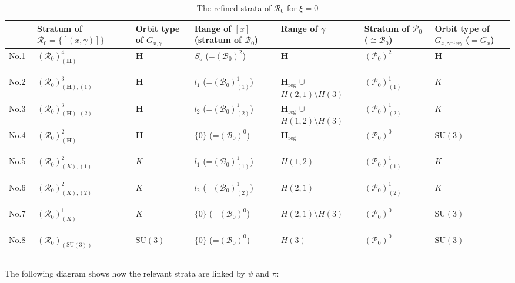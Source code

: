 \documentclass[12pt]{amsart}
\theoremstyle{definition}
\numberwithin{equation}{section}
\newcommand{\SU}{\mathrm{SU}}
\newcommand{\SET}[1]{\{#1\}}
\newcommand{\Hreg}{\Cartan_{\mathrm{reg}}}
\newcommand{\Cartan}{\mathbf{H}}
\newcommand{\Rxizero}{\mathcal{R}_{0}}
\newcommand{\Pxizero}{\mathcal{P}_{0}}
\newcommand{\Bxizero}{\mathcal{B}_{0}}
\begin{document}
       \begin{table}[H]\centering
 \caption{The refined strata of  $\Rxizero $    for  $\xi=0$ } \label{Table:strataxizero}
 \begin{tabularx}{\textwidth}{|>{\raggedright\arraybackslash}X|p{2cm}  |>{\raggedright\arraybackslash}X|p{3cm}|>{\raggedright\arraybackslash}X|>{\raggedright\arraybackslash}X|>{\raggedright\arraybackslash}X|} 
 \hline
 &
 Stratum of    $\Rxizero  = \SET{[(x,\gamma)]}$   &  Orbit type of $G_{x, \gamma}$   & Range of $[x]$ (stratum of $\Bxizero $) & Range of $\gamma$	   &  Stratum of $\Pxizero $ ($\cong \Bxizero $)   & Orbit type of $G_{x,\gamma^{-1}x\gamma}$ ($=G_{x}$)  \\  
  \hline  No.1 ~& 
  $(\Rxizero)^4_{(\Cartan)}$ &	$\Cartan$ & $S_o$ (=$(\Bxizero)^2 $) & $\Cartan$     & $(\Pxizero)^2 $  & $\Cartan$ \\ 
  \hline  No.2 ~& $(\Rxizero)^3_{(\Cartan),(1)}$
   & $\Cartan$ &	$l_1$ (=$(\Bxizero)^1_{(1)}  $) &  $\Hreg$ $\cup$ $H(2,1)\setminus H(3)$    &  $(\Pxizero)^1_{(1)}   $ &  $K$  \\\hline
   No.3 ~& $(\Rxizero)^3_{(\Cartan),(2)}$
   & $\Cartan$ &	$l_2$ (=$ (\Bxizero)^1_{(2)}  $) &  $\Hreg$ $\cup$ $H(1,2)\setminus H(3)$    &  $(\Pxizero)^1_{(2)}   $ &  $K$  \\
   \hline
   No.4 ~& $(\Rxizero)^2_{(\Cartan)}$
   & $\Cartan$ &	$\SET{0}$ (=$ (\Bxizero)^0   $) &  $\Hreg  $    &  $(\Pxizero)^0 $ &  $\SU(3)$ \\
\hline  No.5 ~&
  $(\Rxizero)^2_{(K),(1)}$ & $K$ &	$l_1$ (=$(\Bxizero)^1_{(1)}  $) & $H(1,2)$    &  $(\Pxizero)^1_{(1)}    $ &  $K$  \\
  \hline  No.6 ~&
  $(\Rxizero)^2_{(K),(2)}$ & $K$ &	$l_2$ (=$(\Bxizero)^1_{(2)}  $) & $H(2,1)$    &  $(\Pxizero)^1_{(2)}    $ &  $K$  \\
  \hline  No.7 ~& 
  $(\Rxizero)^1_{(K)}$ & $K$ &	$\SET{0}$ (=$(\Bxizero)^0   $) & $H(2,1)\setminus H(3)$    &  $(\Pxizero)^0  $ &  $\SU(3)$  \\\hline  No.8 ~& 
  $(\Rxizero)_{(\SU(3))}$ & $\SU(3)$ &	$\SET{0}$   (=$(\Bxizero)^0   $) & $H(3) $    &  $(\Pxizero)^0  $ &  $\SU(3)$  \\  
  \hline     
    \end{tabularx}
   \end{table}  


The following diagram shows how the relevant strata are linked by $\psi$ and $\pi$:
\end{document}
